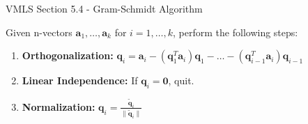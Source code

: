 \begin{notes}{VMLS Section 5.4 - Gram-Schmidt Algorithm}
    \begin{highlight}
        Given n-vectors $\mathbf{a}_1, \ldots, \mathbf{a}_k$ for $i = 1, \ldots, k$, perform the following steps:

        \begin{enumerate}
            \item \textbf{Orthogonalization:} $\mathbf{q}_i = \mathbf{a}_i - (\mathbf{q}_1^T \mathbf{a}_i)\mathbf{q}_1 - \ldots - (\mathbf{q}_{i-1}^T \mathbf{a}_i)\mathbf{q}_{i-1}$
            \item \textbf{Linear Independence:} If $\mathbf{q}_i = \mathbf{0}$, quit.
            \item \textbf{Normalization:} $\mathbf{q}_i = \frac{\mathbf{\tilde{q}}_i}{\|\mathbf{\tilde{q}}_i\|}$
        \end{enumerate}

    \end{highlight}
\end{notes}